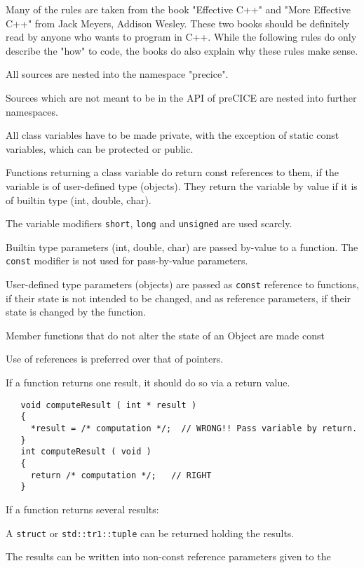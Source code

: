 \documentclass[11pt, oneside]{scrartcl}
\begin{document}
Many of the rules are taken from the book "Effective C++" and "More Effective C++"
from Jack Meyers, Addison Wesley. These two books should be definitely read by
anyone who wants to program in C++. While the following rules do only describe the
"how" to code, the books do also explain why these rules make sense.
\begin{itemize*}
\item All sources are nested into the namespace "precice".
\item Sources which are not meant to be in the API of preCICE are nested into
further namespaces.
\item All class variables have to be made private, with the exception of static
const variables, which can be protected or public.
\item Functions returning a class variable do return const references to them, if
the variable is of user-defined type (objects). They return the variable by value
if it is of builtin type (int, double, char).
\item The variable modifiers \texttt{short}, \texttt{long} and \texttt{unsigned}
are used scarcly.
\item Builtin type parameters (int, double, char) are passed by-value to a
function. The \texttt{const} modifier is not used for pass-by-value parameters.
\item User-defined type parameters (objects) are passed as \texttt{const}
reference to functions, if their state is not intended to be changed, and as
reference parameters, if their state is changed by the function.
\item Member functions that do not alter the state of an Object are made const
\item Use of references is preferred over that of pointers.
\item  If a function returns one result, it should do so via a return value.
\begin{verbatim} 
   void computeResult ( int * result )
   {
     *result = /* computation */;  // WRONG!! Pass variable by return.
   }
   int computeResult ( void )
   {
     return /* computation */;   // RIGHT
   }
\end{verbatim}
\item If a function returns several results:
  \begin{itemize*}
  \item A \texttt{struct} or \texttt{std::tr1::tuple} can be returned holding the
  results.
  \item The results can be written into non-const reference parameters given to the

\end{itemize*}
\end{itemize*}
\end{document}
